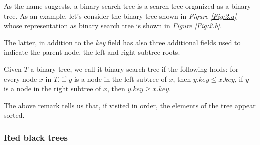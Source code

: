 \documentclass{subfiles}
\begin{document}
    As the name suggests, a binary search tree is a search tree organized as a binary tree.
    As an example, let's consider the binary tree shown in \emph{Figure \ref{Fig:2.a}}
    whose representation as binary search tree is shown in \emph{Figure \ref{Fig:2.b}}.
    
    The latter, in addition to the \emph{key} field has also three additional fields
    used to indicate the parent node, the left and right subtree roots.

    \begin{remark*}
        Given \(T\) a binary tree, we call it binary search tree if the following holds:
        for every node \(x\) in \(T\), 
        if \(y\) is a node in the left subtree of \(x\), then \(y.key \le x.key\),
        if \(y\) is a node in the right subtree of \(x\), then \(y.key \ge x.key\).
    \end{remark*}

    The above remark tells us that, if visited in order, 
    the elements of the tree appear sorted.

    \subsubsection{Red black trees}
    
\end{document}
